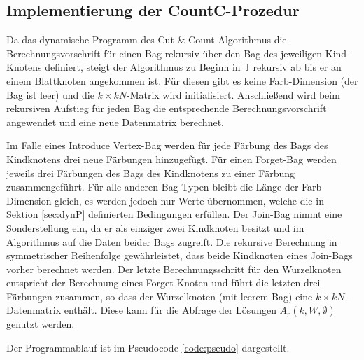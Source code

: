\subsection{Implementierung der CountC-Prozedur}
\label{ssec:countc}
Da das dynamische Programm des Cut \& Count-Algorithmus die Berechnungsvorschrift für einen Bag rekursiv über den Bag des jeweiligen Kind-Knotens definiert, steigt der Algorithmus zu Beginn in $\mathbb{T}$ rekursiv ab bis er an einem Blattknoten angekommen ist. 
Für diesen gibt es keine Farb-Dimension (der Bag ist leer) und die $k \times kN$-Matrix wird initialisiert. 
Anschließend wird beim rekursiven Aufstieg für jeden Bag die entsprechende Berechnungsvorschrift angewendet und eine neue Datenmatrix berechnet. 

Im Falle eines \glqq Introduce Vertex\grqq -Bag werden für jede Färbung des Bags des Kindknotens drei neue Färbungen hinzugefügt.
Für einen \glqq Forget\grqq -Bag werden jeweils drei Färbungen des Bags des Kindknotens zu einer Färbung zusammengeführt.
Für alle anderen Bag-Typen bleibt die Länge der Farb-Dimension gleich, es werden jedoch nur Werte übernommen, welche die in Sektion \ref{sec:dynP} definierten Bedingungen erfüllen. 
Der \glqq Join\grqq -Bag nimmt eine Sonderstellung ein, da er als einziger zwei Kindknoten besitzt und im Algorithmus auf die Daten beider Bags zugreift. 
Die rekursive Berechnung in symmetrischer Reihenfolge gewährleistet, dass beide Kindknoten eines \glqq Join\grqq -Bags vorher berechnet werden. 
Der letzte Berechnungsschritt für den Wurzelknoten entspricht der Berechnung eines \glqq Forget\grqq -Knoten und führt die letzten drei Färbungen zusammen, so dass der Wurzelknoten (mit leerem Bag) eine $k \times kN$-Datenmatrix enthält. 
Diese kann für die Abfrage der Lösungen $A_r(k,W,\emptyset)$ genutzt werden.

Der Programmablauf ist im Pseudocode \ref{code:pseudo} dargestellt.

